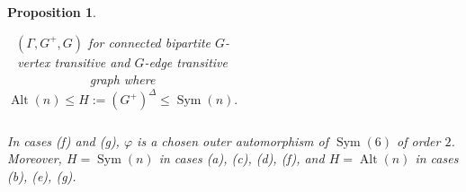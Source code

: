 \documentclass[11pt]{amsart}
\newtheorem{proposition}[theorem]{Proposition}
\DeclareMathOperator{\Sym}{Sym}
\DeclareMathOperator{\Alt}{Alt}
\DeclareMathOperator{\Diag}{Diag}
\newcommand{\id}{\mathrm{id}}
\begin{document}
\begin{proposition}
\begin{table}[ht]
\begin{tabular}{c|ccc}
        \end{tabular}
        \caption{\((\Gamma,G^+,G)\) for connected bipartite \(G\)-vertex transitive and \(G\)-edge transitive graph where \(\Alt(n)\leqslant H:=(G^+)^\Delta\leqslant\Sym(n).\) }
        \label{tab:placeholder}
    \end{table}
    
In cases (f) and (g), $\varphi$ is a chosen outer automorphism of $\Sym(6)$ of order $2$.
Moreover, $H=\Sym(n)$ in cases (a), (c), (d), (f), and $H=\Alt(n)$ in cases (b), (e), (g). 



\end{proposition}
\end{document}
